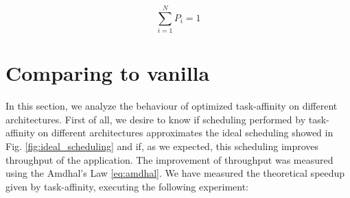 \begin{equation}
       \sum_{i=1}^N P_{i} = 1
\label{eq:contr_amdhal}
\end{equation}
\newpage

\section{Comparing to vanilla}

In this section, we analyze the behaviour of optimized task-affinity on different architectures. First of all, we desire to know if scheduling performed by 
task-affinity on different architectures approximates the ideal scheduling showed in Fig. \ref{fig:ideal_scheduling} and if, as we expected, this 
scheduling improves throughput of the application. The improvement of throughput was measured using the Amdhal's Law \ref{eq:amdhal}. We have measured the 
theoretical speedup given by task-affinity, executing the following experiment:

